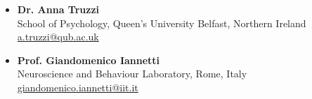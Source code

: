 \documentclass[10pt,a4paper]{altacv}
\begin{document}
\begin{fullwidth}
\begin{itemize}
			\item \textbf{Dr. Anna Truzzi}\\
			School of Psychology, Queen's University Belfast, Northern Ireland\\
			\href{mailto:a.truzzi@qub.ac.uk}{a.truzzi@qub.ac.uk}
			
			\item \textbf{Prof. Giandomenico Iannetti}\\
			Neuroscience and Behaviour Laboratory, Rome, Italy\\
			\href{mailto:giandomenico.iannetti@iit.it}{giandomenico.iannetti@iit.it}

		\end{itemize}
		
	\end{fullwidth}
	
\end{document}
